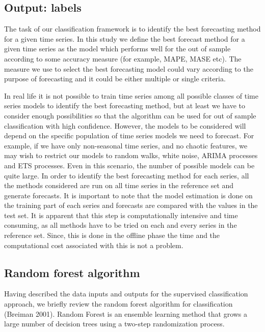 \documentclass[11pt,]{article}
\theoremstyle{definition}
\theoremstyle{definition}
\theoremstyle{definition}
\theoremstyle{remark}
\begin{document}
\subsection{Output: labels}\label{output-labels}

The task of our classification framework is to identify the best
forecasting method for a given time series. In this study we define the
best forecast method for a given time series as the model which performs
well for the out of sample according to some accuracy measure (for
example, MAPE, MASE etc). The measure we use to select the best
forecasting model could vary according to the purpose of forecasting and
it could be either multiple or single criteria.

In real life it is not possible to train time series among all possible
classes of time series models to identify the best forecasting method,
but at least we have to consider enough possibilities so that the
algorithm can be used for out of sample classification with high
confidence. However, the models to be considered will depend on the
specific population of time series models we need to forecast. For
example, if we have only non-seasonal time series, and no chaotic
features, we may wish to restrict our models to random walks, white
noise, ARIMA processes and ETS processes. Even in this scenario, the
number of possible models can be quite large. In order to identify the
best forecasting method for each series, all the methods considered are
run on all time series in the reference set and generate forecasts. It
is important to note that the model estimation is done on the training
part of each series and forecasts are compared with the values in the
test set. It is apparent that this step is computationally intensive and
time consuming, as all methods have to be tried on each and every series
in the reference set. Since, this is done in the offline phase the time
and the computational cost associated with this is not a problem.

\subsection{Random forest algorithm}\label{random-forest-algorithm}

Having described the data inputs and outputs for the supervised
classification approach, we briefly review the random forest algorithm
for classification (Breiman 2001). Random Forest is an ensemble learning
method that grows a large number of decision trees using a two-step
randomization process.
\end{document}
